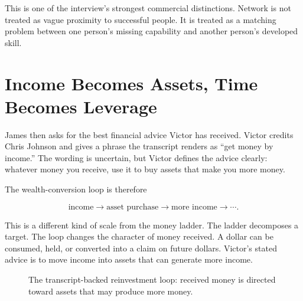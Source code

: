 This is one of the interview's strongest commercial distinctions. Network is not treated as vague proximity to successful people. It is treated as a matching problem between one person's missing capability and another person's developed skill.

\section{Income Becomes Assets, Time Becomes Leverage}

James then asks for the best financial advice Victor has received. Victor credits Chris Johnson and gives a phrase the transcript renders as ``get money by income.'' The wording is uncertain, but Victor defines the advice clearly: whatever money you receive, use it to buy assets that make you more money.

The wealth-conversion loop is therefore

\begin{equation}
\text{income}
\longrightarrow
\text{asset purchase}
\longrightarrow
\text{more income}
\longrightarrow
\cdots.
\end{equation}

This is a different kind of scale from the money ladder. The ladder decomposes a target. The loop changes the character of money received. A dollar can be consumed, held, or converted into a claim on future dollars. Victor's stated advice is to move income into assets that can generate more income.

\begin{figure}[h]
\centering
{}
\caption{The transcript-backed reinvestment loop: received money is directed toward assets that may produce more money.}
\end{figure}


